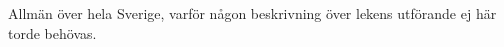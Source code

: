 \vspace{10mm}
Allmän över hela Sverige, varför någon beskrivning över
lekens utförande ej här torde behövas.
\vspace{5mm}